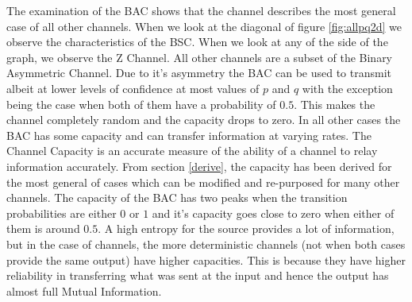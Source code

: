 The examination of the BAC shows that the channel describes the most general case of all other channels. When we look at the diagonal of figure \ref{fig:allpq2d} we observe the characteristics of the BSC. When we look at any of the side of the graph, we observe the Z Channel. All other channels are a subset of the Binary Asymmetric Channel. Due to it's asymmetry the BAC can be used to transmit albeit at lower levels of confidence at most values of $p$ and $q$ with the exception being the case when both of them have a probability of $0.5$. This makes the channel completely random and the capacity drops to zero. In all other cases the BAC has some capacity and can transfer information at varying rates. The Channel Capacity is an accurate measure of the ability of a channel to relay information accurately. From section \ref{derive}, the capacity has been derived for the most general of cases which can be modified and re-purposed for many other channels. The capacity of the BAC has two peaks when the transition probabilities are either $0$ or $1$ and it's capacity goes close to zero when either of them is around $0.5$. A high entropy for the source provides a lot of information, but in the case of channels, the more deterministic channels (not when both cases provide the same output) have higher capacities. This is because they have higher reliability in transferring what was sent at the input and hence the output has almost full Mutual Information.